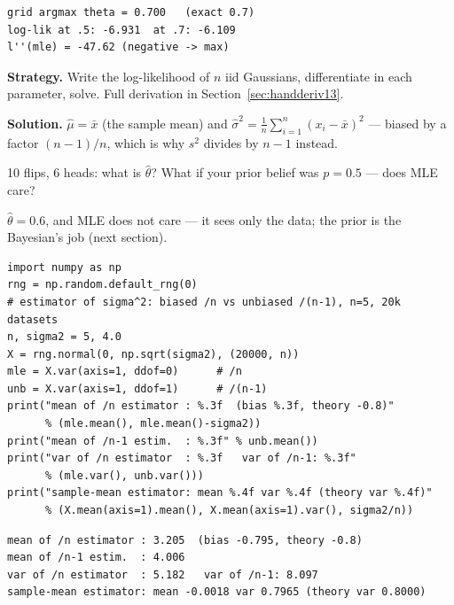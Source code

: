 \begin{lstlisting}[caption={Output of the coin MLE. Notice
$\ell''(0.7)=-47.6<0$ --- a maximum, and its magnitude is the curvature
that Fisher information formalizes.}]
grid argmax theta = 0.700   (exact 0.7)
log-lik at .5: -6.931  at .7: -6.109
l''(mle) = -47.62 (negative -> max)
\end{lstlisting}

\begin{example}\label{ex:mlegauss}
\textbf{Strategy.} Write the log-likelihood of $n$ iid Gaussians,
differentiate in each parameter, solve. Full derivation in
Section~\ref{sec:handderiv13}.

\textbf{Solution.} $\hat\mu=\bar x$ (the sample mean) and
$\hat\sigma^{2}=\frac1n\sum_{i=1}^{n}(x_i-\bar x)^{2}$ --- biased by a factor
$(n-1)/n$, which is why $s^{2}$ divides by $n-1$ instead.
\end{example}

\begin{exercise}[easy]
10 flips, 6 heads: what is $\hat\theta$? What if your prior belief was
$p=0.5$ --- does MLE care?
\begin{solution}
$\hat\theta=0.6$, and MLE does not care --- it sees only the data; the
prior is the Bayesian's job (next section).
\end{solution}
\end{exercise}

\begin{lstlisting}[caption={\ttfamily code/ch13\_sampling\_dist.py ---
the $n$ vs.\ $n-1$ story measured, not asserted: 20k datasets of $n=5$.}]
import numpy as np
rng = np.random.default_rng(0)
# estimator of sigma^2: biased /n vs unbiased /(n-1), n=5, 20k datasets
n, sigma2 = 5, 4.0
X = rng.normal(0, np.sqrt(sigma2), (20000, n))
mle = X.var(axis=1, ddof=0)      # /n
unb = X.var(axis=1, ddof=1)      # /(n-1)
print("mean of /n estimator : %.3f  (bias %.3f, theory -0.8)"
      % (mle.mean(), mle.mean()-sigma2))
print("mean of /n-1 estim.  : %.3f" % unb.mean())
print("var of /n estimator  : %.3f   var of /n-1: %.3f"
      % (mle.var(), unb.var()))
print("sample-mean estimator: mean %.4f var %.4f (theory var %.4f)"
      % (X.mean(axis=1).mean(), X.mean(axis=1).var(), sigma2/n))
\end{lstlisting}

\begin{lstlisting}[caption={Output of the sampling experiment. Notice the
trade-off in real numbers: $/n$ underestimates by exactly the predicted
$-0.8$ but has \emph{smaller} variance --- bias and variance really do
trade.}]
mean of /n estimator : 3.205  (bias -0.795, theory -0.8)
mean of /n-1 estim.  : 4.006
var of /n estimator  : 5.182   var of /n-1: 8.097
sample-mean estimator: mean -0.0018 var 0.7965 (theory var 0.8000)
\end{lstlisting}

